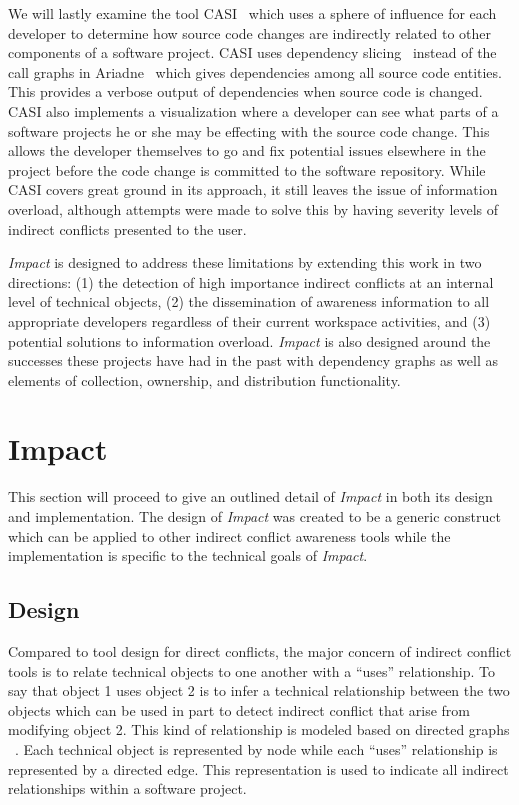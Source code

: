 \documentclass[conference]{IEEEtran}
\begin{document}
We will lastly examine the tool CASI~\cite{Servant:2010:CPI} which uses
a sphere of influence for each developer to determine how source code
changes are indirectly related to other components of a software project.
CASI uses dependency slicing~\cite{Bajracharya:2009:SIS} instead of the 
call graphs in Ariadne~\cite{Trainer:2005:BGT} which gives dependencies among
all source code entities. This provides a verbose output of dependencies when
source code is changed. CASI also implements a visualization where
a developer can see what parts of a software projects he or she may be effecting
with the source code change. This allows the developer themselves to go and fix
potential issues elsewhere in the project before the code change is committed
to the software repository. While CASI covers great ground in its approach,
it still leaves the issue of information overload, although attempts were made
to solve this by having severity levels of indirect conflicts presented to
the user.

\textit{Impact} is designed to address these limitations by extending this work in
two directions: (1) the detection of high importance indirect conflicts at an internal level
of technical objects, (2) the dissemination of
awareness information to all appropriate developers regardless of their current
workspace activities, and (3) potential solutions to information overload. 
\textit{Impact} is also designed around the successes these
projects have had in the past with dependency graphs as 
well as elements of collection, ownership, and distribution functionality.


\section{Impact}
This section will proceed to give an outlined detail of \textit{Impact} in both its
design and implementation. The design of \textit{Impact} was created to be
a generic construct which can be applied to other indirect conflict 
awareness tools while the implementation is specific to the technical
goals of \textit{Impact}.

\subsection{Design}
Compared to tool design for direct conflicts, the major concern of 
indirect conflict tools is to relate technical objects to one another
with a ``uses'' relationship. To say that object 1 uses object 2 is to infer
a technical relationship between the two objects which can be used
in part to detect indirect conflict that arise from modifying object
2. This kind of relationship is modeled based on directed graphs ~\cite{Horwitz:1992:UPD}. 
Each technical object is represented by node while each ``uses''
relationship is represented by a directed edge. This representation
is used to indicate all indirect relationships within a software project.
\end{document}
